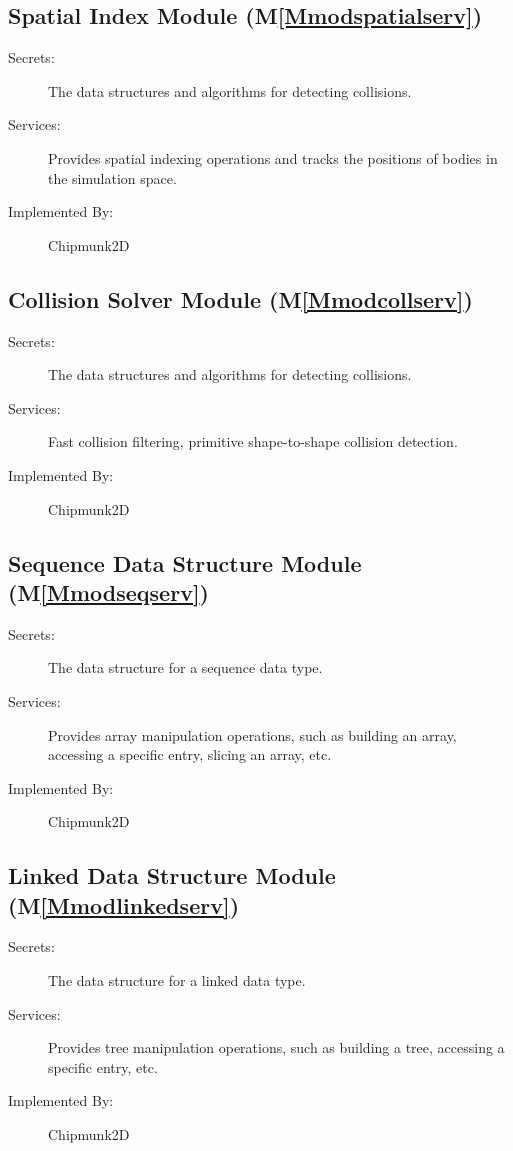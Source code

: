 \documentclass[12pt]{article}
\begin{document}
\subsection{Spatial Index Module (M\ref{Mmodspatialserv})}
\label{Sec:SIM()}
\begin{description}
\item[Secrets:]The data structures and algorithms for detecting collisions.
\item[Services:]Provides spatial indexing operations and tracks the positions of bodies in the simulation space.
\item[Implemented By:]Chipmunk2D
\end{description}
\subsection{Collision Solver Module (M\ref{Mmodcollserv})}
\label{Sec:CSM()}
\begin{description}
\item[Secrets:]The data structures and algorithms for detecting collisions.
\item[Services:]Fast collision filtering, primitive shape-to-shape collision detection.
\item[Implemented By:]Chipmunk2D
\end{description}
\subsection{Sequence Data Structure Module (M\ref{Mmodseqserv})}
\label{Sec:SDSM()}
\begin{description}
\item[Secrets:]The data structure for a sequence data type.
\item[Services:]Provides array manipulation operations, such as building an array, accessing a specific entry, slicing an array, etc.
\item[Implemented By:]Chipmunk2D
\end{description}
\subsection{Linked Data Structure Module (M\ref{Mmodlinkedserv})}
\label{Sec:LDSM()}
\begin{description}
\item[Secrets:]The data structure for a linked data type.
\item[Services:]Provides tree manipulation operations, such as building a tree, accessing a specific entry, etc.
\item[Implemented By:]Chipmunk2D
\end{description}
\end{document}
